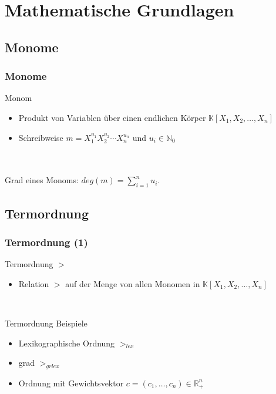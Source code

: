 \documentclass{beamer}
\begin{document}

\section{Mathematische Grundlagen}



\subsection{Monome}

\begin{frame}[fragile]
\frametitle{Monome }

\begin{block}{Monom}
\begin{itemize}
\item Produkt von Variablen über einen endlichen Körper $ \mathbb{K} \left[X_{1},X_{2},\dots, X_{n}\right]  $ 
\item Schreibweise $m= X_{1}^{u_{1}}X_{2}^{u_{2}}\cdots X_{n}^{u_{n}}$ und $u_i \in \mathbb{N}_{0}  $
\end{itemize}

\end{block}
~\\
~\\
Grad eines Monoms:  $deg(m) = \sum_{i=1}^n u_i $. 




\end{frame}

\subsection{Termordnung}

\begin{frame}[fragile]
\frametitle{Termordnung (1)}
\begin{block}{Termordnung $>$}
\begin{itemize}
\item Relation $>$ auf der Menge von allen Monomen in $ \mathbb{K} \left[X_{1},X_{2},\dots, X_{n}\right]  $ 
\end{itemize}

\end{block}

~\\

\begin{block}{Termordnung Beispiele }
\begin{itemize}
\item Lexikographische Ordnung $>_{lex}$
\item grad $>_{grlex}$
\item Ordnung mit Gewichtsvektor $c = (c_1, \ldots , c_n ) \in \mathbb{R}^{n}_{+}$
\end{itemize}



\end{block}


\end{frame}
\end{document}
